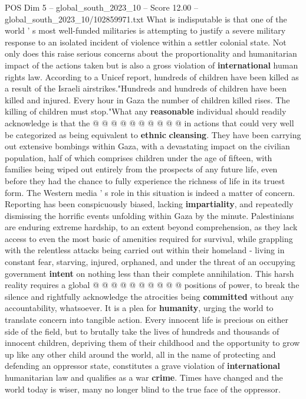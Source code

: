 \begin{textsample}{POS Dim 5 – global\_south\_2023\_10 – Score 12.00 – global\_south\_2023\_10/102859971.txt}
What is indisputable is that one of the world ' s most well-funded militaries is attempting to justify a severe military response to an isolated incident of violence within a settler colonial state.
Not only does this raise serious concerns about the proportionality and humanitarian impact of the actions taken but is also a gross violation of \textbf{international} human rights law.
According to a Unicef report, hundreds of children have been killed as a result of the Israeli airstrikes."Hundreds and hundreds of children have been killed and injured.
Every hour in Gaza the number of children killed rises.
The killing of children must stop."What any \textbf{reasonable} individual should readily acknowledge is that the @ @ @ @ @ @ @ @ @ @ in actions that could very well be categorized as being equivalent to \textbf{ethnic} \textbf{cleansing}.
They have been carrying out extensive bombings within Gaza, with a devastating impact on the civilian population, half of which comprises children under the age of fifteen, with families being wiped out entirely from the prospects of any future life, even before they had the chance to fully experience the richness of life in its truest form.
The Western media ' s role in this situation is indeed a matter of concern.
Reporting has been conspicuously biased, lacking \textbf{impartiality}, and repeatedly dismissing the horrific events unfolding within Gaza by the minute.
Palestinians are enduring extreme hardship, to an extent beyond comprehension, as they lack access to even the most basic of amenities required for survival, while grappling with the relentless attacks being carried out within their homeland - living in constant fear, starving, injured, orphaned, and under the threat of an occupying government \textbf{intent} on nothing less than their complete annihilation.
This harsh reality requires a global @ @ @ @ @ @ @ @ @ @ positions of power, to break the silence and rightfully acknowledge the atrocities being \textbf{committed} without any accountability, whatsoever.
It is a plea for \textbf{humanity}, urging the world to translate concern into tangible action.
Every innocent life is precious on either side of the field, but to brutally take the lives of hundreds and thousands of innocent children, depriving them of their childhood and the opportunity to grow up like any other child around the world, all in the name of protecting and defending an oppressor state, constitutes a grave violation of \textbf{international} humanitarian law and qualifies as a war \textbf{crime}.
Times have changed and the world today is wiser, many no longer blind to the true face of the oppressor.

\end{textsample}

